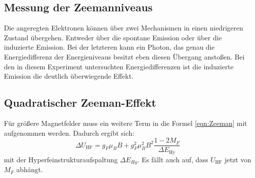 \subsection{Messung der Zeemanniveaus}
Die angeregten Elektronen können über zwei Mechanismen in einen niedrigeren Zustand übergehen. Entweder über die spontane Emission oder über die induzierte Emission. Bei der letzteren kann ein Photon, das genau die Energiedifferenz der Energieniveaus besitzt eben diesen Übergang anstoßen. Bei den in diesem Experiment untersuchten Energiedifferenzen ist die induzierte Emission die deutlich überwiegende Effekt.
\subsection{Quadratischer Zeeman-Effekt}
Für größere Magnetfelder muss ein weitere Term in die Formel \eqref{eqn:Zeeman} mit aufgenommen werden. Dadurch ergibt sich:
\begin{equation}
	\Delta U_\text{HF}=g_F\mu_BB + g_F^2\mu_B^2B^2\frac{1-2M_F}{\Delta E_\text{Hy}}
\end{equation}
mit der Hyperfeinstrukturaufspaltung $\Delta E_{Hy}$. Es fällt auch auf, dass $U_\text{HF}$ jetzt von $M_F$ abhängt.

